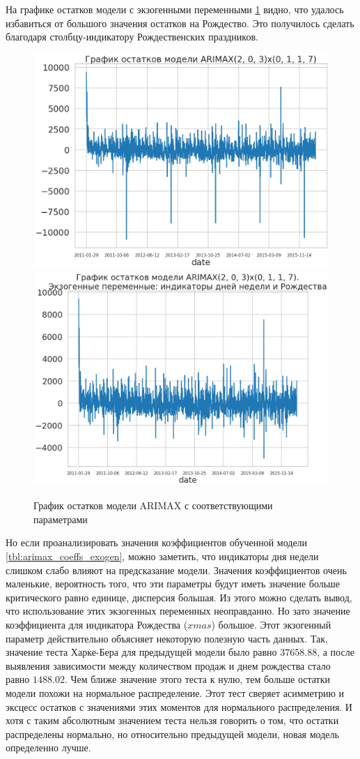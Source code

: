 На графике остатков модели с экзогенными переменными \ref{img:arimax_resid} видно, что удалось избавиться
от большого значения остатков на Рождество. Это получилось сделать благодаря
столбцу-индикатору Рождественских праздников.

\def\figurename{Рис}
\begin{figure}[t]
	\centering
	\includegraphics[width=0.4\columnwidth]{./img/arimax_resid.png}
	\includegraphics[width=0.4\columnwidth]{./img/arimax_resid_with_xmas.png}
	\caption{График остатков модели ARIMAX с соответствующими параметрами}
	\label{img:arimax_resid}
\end{figure}

Но если проанализировать значения коэффициентов обученной модели \ref{tbl:arimax_coeffs_exogen},
можно заметить, что индикаторы дня недели слишком слабо влияют на предсказание модели.
Значения коэффициентов очень маленькие, вероятность того, что эти параметры будут иметь
значение больше критического равно единице, дисперсия большая. Из этого можно сделать вывод,
что использование этих экзогенных переменных неоправданно. Но зато значение коэффициента
для индикатора Рождества ($ xmas $) большое. Этот экзогенный параметр
действительно объясняет некоторую полезную часть данных. Так, значение теста Харке-Бера \cite{thadewald2007jarque}
для предыдущей модели было равно $ 37658.88 $, а после выявления зависимости между количеством продаж
и днем рождества стало равно $ 1488.02 $. Чем ближе значение этого теста к нулю, тем больше остатки
модели похожи на нормальное распределение. Этот тест сверяет асимметрию и эксцесс остатков с
значениями этих моментов для нормального распределения. И хотя с таким абсолютным значением
теста нельзя говорить о том, что остатки распределены нормально, но относительно предыдущей
модели, новая модель определенно лучше.

